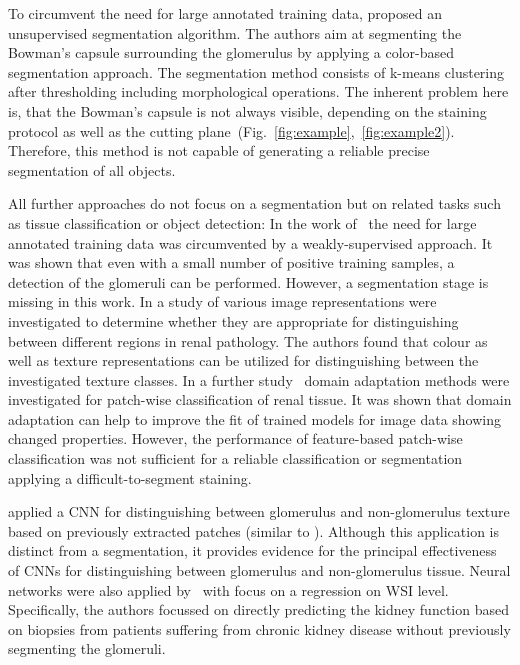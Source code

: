 \documentclass{elsarticle}
\begin{document}
To circumvent the need for large annotated training data, \cite{mySamsi12a} proposed an unsupervised segmentation algorithm. The authors aim at segmenting the Bowman's capsule surrounding the glomerulus by applying a color-based segmentation approach. The segmentation method consists of k-means clustering after thresholding including morphological operations. The inherent problem here is, that the Bowman's capsule is not always visible, depending on the staining protocol as well as the cutting plane~(Fig.~\ref{fig:example},~\ref{fig:example2}). Therefore, this method is not capable of generating a reliable precise segmentation of all objects.

All further approaches do not focus on a segmentation but on related tasks such as tissue classification or object detection:
In the work of~\cite{Gadermayr16f} the need for large annotated training data was circumvented by a weakly-supervised approach. It was shown that even with a small number of positive training samples, a detection of the glomeruli can be performed. However, a segmentation stage is missing in this work.
%
In a study of \cite{myHerve11a} various image representations were investigated to determine whether they are appropriate for distinguishing between different regions in renal pathology. The authors found that colour as well as texture representations can be utilized for distinguishing between the investigated texture classes.
%
In a further study~\citep{Gadermayr16e} domain adaptation methods were investigated for patch-wise classification of renal tissue. It was shown that domain adaptation can help to improve the fit of trained models for image data showing changed properties. However, the performance of feature-based patch-wise classification was not sufficient for a reliable classification or segmentation applying a difficult-to-segment staining.

\cite{myPedraza17a} applied a CNN for distinguishing between glomerulus and non-glomerulus texture based on previously extracted patches (similar to \cite{Gadermayr16e,myHerve11a}). Although this application is distinct from a segmentation, it provides evidence for the principal effectiveness of CNNs for distinguishing between glomerulus and non-glomerulus tissue.
%
Neural networks were also applied by~\cite{myLedbetter17a} with focus on a regression on WSI level. Specifically, the authors focussed on directly predicting the kidney function based on biopsies from patients suffering from chronic kidney disease without previously segmenting the glomeruli.
\end{document}
